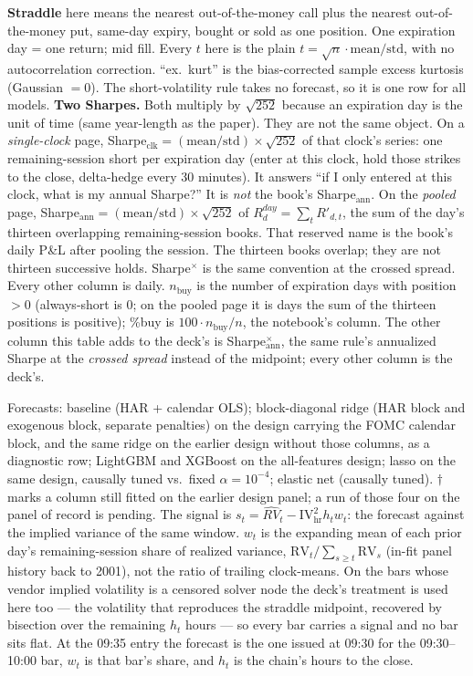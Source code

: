 \documentclass{article}
\begin{document}
\noindent\small \textbf{Straddle} here means the nearest out-of-the-money call plus the nearest out-of-the-money put, same-day expiry, bought or sold as one position. One expiration day = one return; mid fill. Every $t$ here is the plain $t=\sqrt{n}\cdot\mathrm{mean}/\mathrm{std}$, with no autocorrelation correction. ``ex.\ kurt'' is the bias-corrected sample excess kurtosis (Gaussian $=0$). The short-volatility rule takes no forecast, so it is one row for all models. \textbf{Two Sharpes.} Both multiply by $\sqrt{252}$ because an expiration day is the unit of time (same year-length as the paper). They are not the same object. On a \emph{single-clock} page, Sharpe$_{\mathrm{clk}}=(\mathrm{mean}/\mathrm{std})\times\sqrt{252}$ of that clock's series: one remaining-session short per expiration day (enter at this clock, hold those strikes to the close, delta-hedge every 30 minutes). It answers ``if I only entered at this clock, what is my annual Sharpe?'' It is \emph{not} the book's Sharpe$_{\mathrm{ann}}$. On the \emph{pooled} page, Sharpe$_{\mathrm{ann}}=(\mathrm{mean}/\mathrm{std})\times\sqrt{252}$ of $R^{day}_d=\sum_t R'_{d,t}$, the sum of the day's thirteen overlapping remaining-session books. That reserved name is the book's daily P\&L after pooling the session. The thirteen books overlap; they are not thirteen successive holds. Sharpe$^{\times}$ is the same convention at the crossed spread. Every other column is daily. $n_{\mathrm{buy}}$ is the number of expiration days with position $>0$ (always-short is 0; on the pooled page it is days the sum of the thirteen positions is positive); \%buy is $100\cdot n_{\mathrm{buy}}/n$, the notebook's column. The other column this table adds to the deck's is Sharpe$^{\times}_{\mathrm{ann}}$, the same rule's annualized Sharpe at the \emph{crossed spread} instead of the midpoint; every other column is the deck's.

\smallskip
\noindent\small Forecasts: baseline (HAR + calendar OLS); block-diagonal ridge (HAR block and exogenous block, separate penalties) on the design carrying the FOMC calendar block, and the same ridge on the earlier design without those columns, as a diagnostic row; LightGBM and XGBoost on the all-features design; lasso on the same design, causally tuned vs.\ fixed $\alpha=10^{-4}$; elastic net (causally tuned). $\dagger$ marks a column still fitted on the earlier design panel; a run of those four on the panel of record is pending. The signal is $s_t=\widehat{RV}_t-\mathrm{IV}^{2}_{\mathrm{hr}}h_t w_t$: the forecast against the implied variance of the same window. $w_t$ is the expanding mean of each prior day's remaining-session share of realized variance, $\mathrm{RV}_t/\sum_{s\ge t}\mathrm{RV}_s$ (in-fit panel history back to 2001), not the ratio of trailing clock-means. On the bars whose vendor implied volatility is a censored solver node the deck's treatment is used here too --- the volatility that reproduces the straddle midpoint, recovered by bisection over the remaining $h_t$ hours --- so every bar carries a signal and no bar sits flat. At the 09:35 entry the forecast is the one issued at 09:30 for the 09:30--10:00 bar, $w_t$ is that bar's share, and $h_t$ is the chain's hours to the close.
\end{document}
